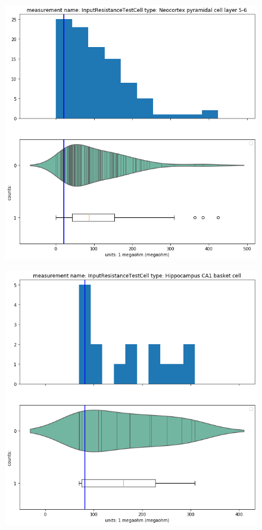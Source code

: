 \begin{figure} 
    \begin{center}   \includegraphics[scale=0.45]{figures/skewed_distribution.png}
    \end{center}
\end{figure}   


\begin{figure} 
    \begin{center}   \includegraphics[scale=0.45]{figures/uniform_distribution.png}
    \end{center}
\end{figure}       

